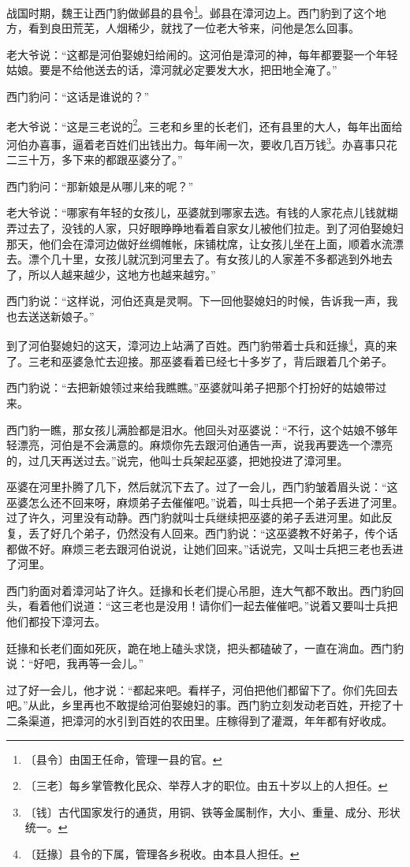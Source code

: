 \documentclass[12pt,UTF-8,openany]{ctexbook}
\begin{document}
\begin{Large}
    
    战国时期，魏王让西门豹做邺县的县令\footnote{〔县令〕由国王任命，管理一县的官。}。邺县在漳河边上。西门豹到了这个地方，看到良田荒芜，人烟稀少，就找了一位老大爷来，问他是怎么回事。
    
    老大爷说：“这都是河伯娶媳妇给闹的。这河伯是漳河的神，每年都要娶一个年轻姑娘。要是不给他送去的话，漳河就必定要发大水，把田地全淹了。”
    
    西门豹问：“这话是谁说的？”
    
    老大爷说：“这是三老说的\footnote{〔三老〕每乡掌管教化民众、举荐人才的职位。由五十岁以上的人担任。}。三老和乡里的长老们，还有县里的大人，每年出面给河伯办喜事，逼着老百姓们出钱出力。每年闹一次，要收几百万钱\footnote{〔钱〕古代国家发行的通货，用铜、铁等金属制作，大小、重量、成分、形状统一。}。办喜事只花二三十万，多下来的都跟巫婆分了。”
    
    西门豹问：“那新娘是从哪儿来的呢？”
    
    老大爷说：“哪家有年轻的女孩儿，巫婆就到哪家去选。有钱的人家花点儿钱就糊弄过去了，没钱的人家，只好眼睁睁地看着自家女儿被他们拉走。到了河伯娶媳妇那天，他们会在漳河边做好丝绸帷帐，床铺枕席，让女孩儿坐在上面，顺着水流漂去。漂个几十里，女孩儿就沉到河里去了。有女孩儿的人家差不多都逃到外地去了，所以人越来越少，这地方也越来越穷。” 
    
    西门豹说：“这样说，河伯还真是灵啊。下一回他娶媳妇的时候，告诉我一声，我也去送送新娘子。”
    
    到了河伯娶媳妇的这天，漳河边上站满了百姓。西门豹带着士兵和廷掾\footnote{〔廷掾〕县令的下属，管理各乡税收。由本县人担任。}，真的来了。三老和巫婆急忙去迎接。那巫婆看着已经七十多岁了，背后跟着几个弟子。
    
    西门豹说：“去把新娘领过来给我瞧瞧。”巫婆就叫弟子把那个打扮好的姑娘带过来。
    
    西门豹一瞧，那女孩儿满脸都是泪水。他回头对巫婆说：“不行，这个姑娘不够年轻漂亮，河伯是不会满意的。麻烦你先去跟河伯通告一声，说我再要选一个漂亮的，过几天再送过去。”说完，他叫士兵架起巫婆，把她投进了漳河里。
    
    巫婆在河里扑腾了几下，然后就沉下去了。过了一会儿，西门豹皱着眉头说：“这巫婆怎么还不回来呀，麻烦弟子去催催吧。”说着，叫士兵把一个弟子丢进了河里。过了许久，河里没有动静。西门豹就叫士兵继续把巫婆的弟子丢进河里。如此反复，丢了好几个弟子，仍然没有人回来。西门豹说：“这巫婆教不好弟子，传个话都做不好。麻烦三老去跟河伯说说，让她们回来。”话说完，又叫士兵把三老也丢进了河里。
    
    西门豹面对着漳河站了许久。廷掾和长老们提心吊胆，连大气都不敢出。西门豹回头，看着他们说道：“这三老也是没用！请你们一起去催催吧。”说着又要叫士兵把他们都投下漳河去。
    
    廷掾和长老们面如死灰，跪在地上磕头求饶，把头都磕破了，一直在淌血。西门豹说：“好吧，我再等一会儿。”
    
    过了好一会儿，他才说：“都起来吧。看样子，河伯把他们都留下了。你们先回去吧。”从此，乡里再也不敢提给河伯娶媳妇的事。西门豹立刻发动老百姓，开挖了十二条渠道，把漳河的水引到百姓的农田里。庄稼得到了灌溉，年年都有好收成。
    
\end{Large}
\end{document}
